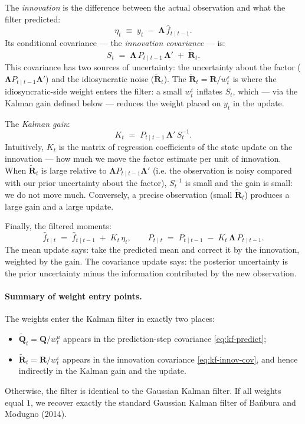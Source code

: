 \documentclass[11pt, a4paper, oneside]{article}
\newcommand{\mL}{\boldsymbol{\Lambda}}
\newcommand{\mR}{\mathbf{R}}
\newcommand{\mQ}{\mathbf{Q}}
\begin{document}
The \emph{innovation} is the difference between the actual observation
and what the filter predicted:
\[
\eta_t \;\equiv\; y_t \;-\; \mL\, \hat{f}_{t \mid t-1}.
\]
Its conditional covariance — the \emph{innovation covariance} — is:
\begin{equation}
S_t \;=\; \mL\, P_{t \mid t-1}\, \mL' \;+\; \tilde{\mR}_t.
\label{eq:kf-innov-cov}
\end{equation}
This covariance has two sources of uncertainty: the uncertainty about
the factor ($\mL P_{t \mid t-1} \mL'$) and the idiosyncratic noise
($\tilde{\mR}_t$). The \emph{$\tilde{\mR}_t = \mR / w^\varepsilon_t$}
is where the idiosyncratic-side weight enters the filter: a small
$w^\varepsilon_t$ inflates $S_t$, which — via the Kalman gain
defined below — reduces the weight placed on $y_t$ in the update.

The \emph{Kalman gain}:
\begin{equation}
K_t \;=\; P_{t \mid t-1}\, \mL'\, S_t^{-1}.
\label{eq:kf-gain}
\end{equation}
Intuitively, $K_t$ is the matrix of regression coefficients of the
state update on the innovation — how much we move the factor estimate
per unit of innovation. When $\tilde{\mR}_t$ is large relative to
$\mL P_{t \mid t-1} \mL'$ (i.e. the observation is noisy compared with
our prior uncertainty about the factor), $S_t^{-1}$ is small and the
gain is small: we do not move much. Conversely, a precise observation
(small $\tilde{\mR}_t$) produces a large gain and a large update.

Finally, the filtered moments:
\begin{equation}
\boxed{\;\;
\hat{f}_{t \mid t} \;=\; \hat{f}_{t \mid t-1} \;+\; K_t\, \eta_t,
\qquad
P_{t \mid t} \;=\; P_{t \mid t-1} \;-\; K_t\, \mL\, P_{t \mid t-1}.
\;\;}
\label{eq:kf-update}
\end{equation}
The mean update says: take the predicted mean and correct it by the
innovation, weighted by the gain. The covariance update says: the
posterior uncertainty is the prior uncertainty minus the information
contributed by the new observation.

\paragraph{Summary of weight entry points.}
The weights enter the Kalman filter in exactly two places:
\begin{itemize}[leftmargin=1.5em, itemsep=3pt]
    \item $\tilde{\mQ}_t = \mQ / w^u_t$ appears in the prediction-step
          covariance \eqref{eq:kf-predict};
    \item $\tilde{\mR}_t = \mR / w^\varepsilon_t$ appears in the
          innovation covariance \eqref{eq:kf-innov-cov}, and hence
          indirectly in the Kalman gain and the update.
\end{itemize}
Otherwise, the filter is identical to the Gaussian Kalman filter. If
all weights equal $1$, we recover exactly the standard Gaussian Kalman
filter of Bańbura and Modugno (2014).
\end{document}
